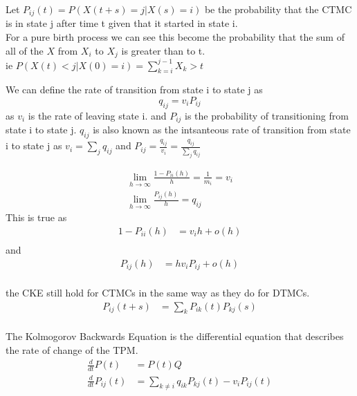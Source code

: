 \documentclass[answers,12pt,addpoints]{exam}
\begin{document}
\begin{definition}
    Let $P_{ij}(t) = P(X(t+s) = j|X(s)=i)$ be the probability that the CTMC is in state j after time t given that it started in state i.\\
    For a pure birth process we can see this become the probability that the sum of all of the $X$ from $X_i$ to $X_j$ is greater than to t.\\
    ie $P(X(t) < j | X(0) = i) = \sum_{k=i}^{j-1} X_k > t $
\end{definition}
\begin{definition}
    We can define the rate of transition from state i to state j as
    $$ q_{ij} = v_i P_{ij}$$
    as $v_i$ is the rate of leaving state i. and $P_{ij}$ is the probability of transitioning from state i to state j.
    $q_{ij}$ is also known as the intsanteous rate of transition from state i to state j as $v_i = \sum_{j} q_{ij}$ and $P_{ij} = \frac{q_{ij}}{v_i} = \frac{q_{ij}}{\sum_{j} q_{ij}}$
\end{definition}
\begin{lemma}
    \begin{align*}
        \lim_{h\to\infty} \frac{1-P_{ii}(h)}{h} = \frac{1}{m_i} = v_i\\
        \lim_{h\to\infty} \frac{P_{ij}(h)}{h} = q_{ij}
    \end{align*}
    This is true as 
    \begin{align*}
        1- P_{ii}(h) &= v_i h + o(h)\\
    \end{align*}
    and 
    \begin{align*}
        P_{ij}(h) &= h v_i P_{ij} + o(h)\\
    \end{align*}
\end{lemma}
\begin{definition}
    the CKE still hold for CTMCs in the same way as they do for DTMCs.\\
    \begin{align*}
        P_{ij}(t+s) &= \sum_{k} P_{ik}(t)P_{kj}(s)\\
    \end{align*}
\end{definition}
\begin{definition}
    The Kolmogorov Backwards Equation is the differential equation that describes the rate of change of the TPM.\\
    \begin{align*}
        \frac{d}{dt} P(t) &= P(t)Q\\
        \frac{d}{dt} P_{ij}(t) &= \sum_{k \neq i} q_{ik}P_{kj}(t) - v_i P_{ij}(t)
    \end{align*}
\end{definition}
\end{document}

